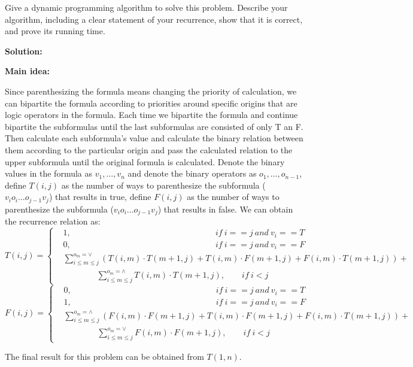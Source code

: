 \documentclass{article}
\begin{document}
Give a dynamic programming algorithm to solve this problem. Describe your algorithm, including a clear statement of your recurrence, show that it is correct, and prove its running time.
{\color{blue}
\par\textbf{Solution: }
\par\textbf{Main idea: }
\par Since parenthesizing the formula means changing the priority of calculation, we can bipartite the formula according to priorities around specific origins that are logic operators in the formula. Each time we bipartite the formula and continue bipartite the subformulas until the last subformulas are consisted of only T an F. Then calculate each subformula's value and calculate the binary relation between them according to the particular origin and pass the calculated relation to the upper subformula until the original formula is calculated. Denote the binary values in the formula as $v_1, \ldots, v_n$ and denote the binary operators as $o_1, \ldots, o_{n-1}$, define $T(i,j)$ as the number of ways to parenthesize the subformula ($v_io_i\ldots o_{j-1}v_j$) that results in true, define $F(i,j)$ as the number of ways to parenthesize the subformula ($v_io_i\ldots o_{j-1}v_j$) that results in false. We can obtain the recurrence relation as: 
	$$
	T(i,j) = \left\{
		\begin{aligned}
			&1, \qquad \qquad \qquad \qquad \quad\ \qquad\qquad\qquad \qquad if\ i == j\ and\ v_i == T\\
			&0, \qquad\qquad \qquad \qquad \qquad \qquad \qquad \quad\ \qquad if\ i == j\ and\ v_i == F\\
			&\sum\limits_{i\leq m \leq j}^{o_m = \lor}{(T(i,m)\cdot T(m+1,j)+T(i,m)\cdot F(m+1,j)+F(i,m)\cdot T(m+1,j))}+\\ &\qquad\qquad\sum\limits_{i\leq m \leq j}^{o_m = \land}{T(i,m)\cdot T(m+1, j)}, \qquad if\ i < j
		\end{aligned}
	\right.	
	$$
	$$
	F(i,j) = \left\{
		\begin{aligned}
			&0, \qquad \qquad \qquad \qquad \qquad \qquad \qquad \qquad \quad\  if\ i == j\ and\ v_i == T\\
			&1, \qquad \qquad \qquad \qquad \qquad \qquad \qquad \qquad \quad\ if\ i == j\ and\ v_i == F\\
			&\sum\limits_{i\leq m \leq j}^{o_m = \land}{(F(i,m)\cdot F(m+1,j)+T(i,m)\cdot F(m+1,j)+F(i,m)\cdot T(m+1,j))}+\\ &\qquad\qquad\sum\limits_{i\leq m \leq j}^{o_m = \lor}{F(i,m)\cdot F(m+1, j)}, \qquad if\ i < j
		\end{aligned}
	\right.	
	$$
	\par The final result for this problem can be obtained from $T(1,n)$.
\pagebreak

}
\end{document}
